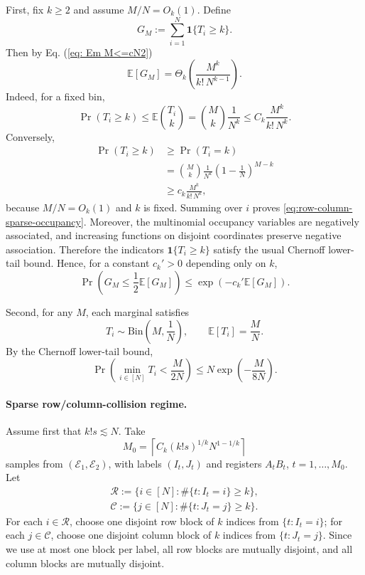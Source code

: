 \documentclass[aps,prx,reprint,superscriptaddress,amsmath,amssymb,longbibliography,floatfix]{revtex4-2}
\newcommand{\dsE}{\mathbb{E}}
\newcommand{\scC}{\mathcal{C}}
\newcommand{\scE}{\mathcal{E}}
\newcommand{\scR}{\mathcal{R}}
\theoremstyle{plain}
\theoremstyle{definition}
\theoremstyle{remark}
\begin{document}
First, fix $k\ge2$ and assume $M/N=O_k(1)$. Define
\[
    G_M:=\sum_{i=1}^N\mathbf 1\{T_i\ge k\}.
\]
Then by Eq. (\ref{eq: Em M<=cN2})
\begin{equation}\label{eq:row-column-sparse-occupancy}
    \dsE[G_M]
    =
    \Theta_k\!\left(\frac{M^k}{k!\,N^{k-1}}\right).
\end{equation}
Indeed, for a fixed bin,
\[
    \Pr(T_i\ge k)
    \le
    \dsE\binom{T_i}{k}
    =
    \binom{M}{k}\frac1{N^k}
    \le
    C_k\frac{M^k}{k!\,N^k}.
\]
Conversely,
\[
\begin{aligned}
\Pr(T_i\ge k)
    &\ge
    \Pr(T_i=k)\\
    &=
    \binom{M}{k}\frac1{N^k}\left(1-\frac1N\right)^{M-k}\\
    &\ge
    c_k\frac{M^k}{k!\,N^k},
\end{aligned}
\]
because $M/N=O_k(1)$ and $k$ is fixed. Summing over $i$ proves
\eqref{eq:row-column-sparse-occupancy}. Moreover, the multinomial occupancy variables are negatively associated, and increasing functions on disjoint coordinates preserve negative association. Therefore the indicators $\mathbf 1\{T_i\ge k\}$ satisfy the usual Chernoff lower-tail bound. Hence, for a constant $c_k'>0$ depending only on $k$,
\begin{equation}\label{eq:row-column-sparse-concentration}
    \Pr\left(G_M\le \frac12\dsE[G_M]\right)
    \le
    \exp\!\left(-c_k'\dsE[G_M]\right).
\end{equation}

Second, for any $M$, each marginal satisfies
\[
    T_i\sim \mathrm{Bin}\left(M,\frac1N\right),
    \qquad
    \dsE[T_i]=\frac{M}{N}.
\]
By the Chernoff lower-tail bound,
\begin{equation}\label{eq:row-column-dense-occupancy}
    \Pr\left(\min_{i\in[N]}T_i<\frac{M}{2N}\right)
    \le
    N\exp\!\left(-\frac{M}{8N}\right).
\end{equation}

\paragraph*{Sparse row/column-collision regime.}
Assume first that $k!s\lesssim N$. Take
$$
M_0=\left\lceil C_k(k!s)^{1/k}N^{1-1/k}\right\rceil
$$
samples from $(\scE_1,\scE_2)$, with labels $(I_t,J_t)$ and registers $A_tB_t$, $t=1,\ldots,M_0$. Let
$$
\begin{gathered}
\scR:=\{i\in[N]:\#\{t:I_t=i\}\ge k\},\\
\scC:=\{j\in[N]:\#\{t:J_t=j\}\ge k\}.
\end{gathered}
$$
For each $i\in\scR$, choose one disjoint row block of $k$ indices from $\{t:I_t=i\}$; for each $j\in\scC$, choose one disjoint column block of $k$ indices from $\{t:J_t=j\}$. Since we use at most one block per label, all row blocks are mutually disjoint, and all column blocks are mutually disjoint.
\end{document}
